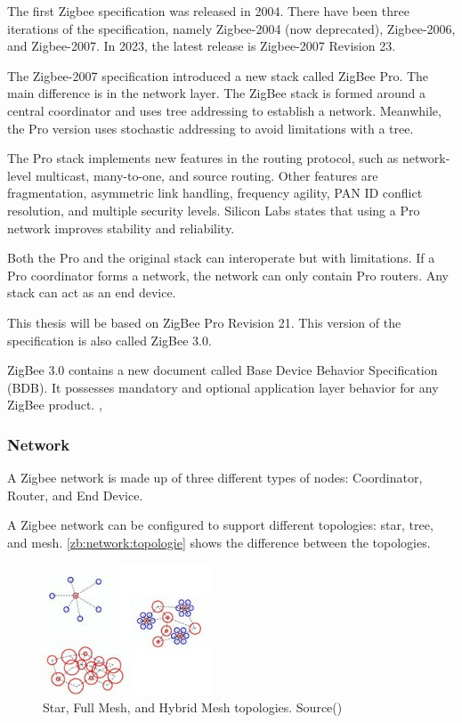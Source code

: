 The first Zigbee specification was released in 2004.
There have been three iterations of the specification, namely Zigbee-2004 (now deprecated), Zigbee-2006, and Zigbee-2007.
In 2023, the latest release is Zigbee-2007 Revision 23.

The Zigbee-2007 specification introduced a new stack called ZigBee Pro. The main difference is in the network layer.
The ZigBee stack is formed around a central coordinator and uses tree addressing to establish a network. Meanwhile,
the Pro version uses stochastic addressing to avoid limitations with a tree. \cite{zigbee:silabs:ug103:2}

The Pro stack implements new features in the routing protocol, such as network-level multicast, many-to-one, and source routing.
Other features are fragmentation, asymmetric link handling, frequency agility, PAN ID conflict resolution, and multiple security levels.
Silicon Labs states that using a Pro network improves stability and reliability.

Both the Pro and the original stack can interoperate but with limitations.
If a Pro coordinator forms a network, the network can only contain Pro routers.
Any stack can act as an end device. \cite{zigbee:silabs:ug103:2}

This thesis will be based on ZigBee Pro Revision 21. This version of the specification is also called ZigBee 3.0.

ZigBee 3.0 contains a new document called Base Device Behavior Specification (BDB).
It possesses mandatory and optional application layer behavior for any ZigBee product. \cite{ti:new:19}, \cite{10.1145/3098243.3098254}

\subsubsection{Network}
\label{zb:net:intro}

A Zigbee network is made up of three different types of nodes: Coordinator, Router, and End Device. \cite{Whitehurst:14}

A Zigbee network can be configured to support different topologies: star, tree, and mesh. \autoref{zb:network:topologie} shows the difference between the topologies.

\begin{figure}[!ht]
    \centering
    \includegraphics[width=50mm, keepaspectratio]{figures/zigbee-topology-ug103-02-fundamentals-zigbee.jpg}
    \caption{Star, Full Mesh, and Hybrid Mesh topologies. Source(\cite{zigbee:silabs:ug103:2})}
    \label{zb:network:topologie}
\end{figure}

